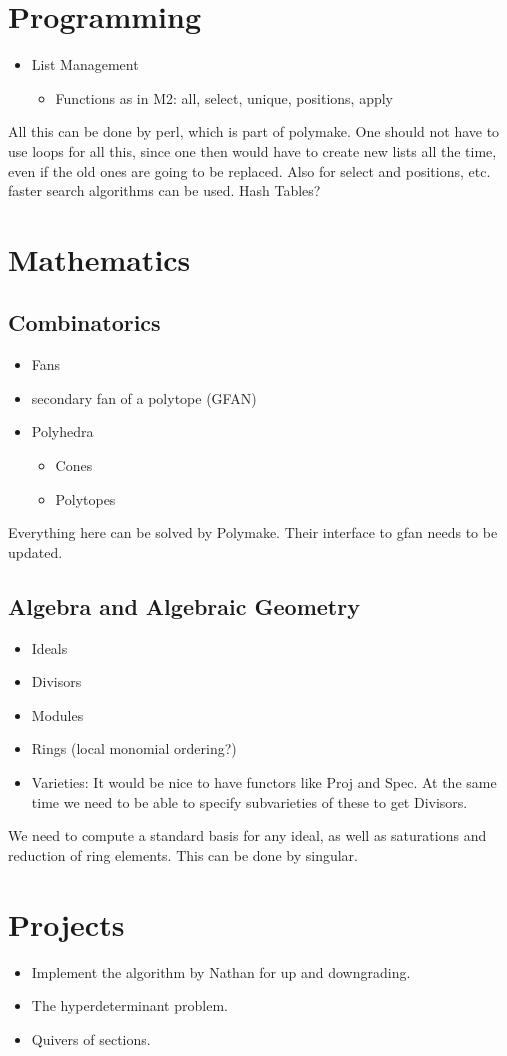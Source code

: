 \documentclass[a4paper]{article}
\begin{document}
\section{Programming}
\begin{itemize}
	\item[] List Management
	\begin{itemize}
		\item[] Functions as in M2: all, select, unique, positions, apply
	\end{itemize}
\end{itemize}
All this can be done by perl, which is part of polymake. One should not have to use loops for all this, since one then would have to create new lists all the time, even if the old ones are going to be replaced. Also for select and positions, etc. faster search algorithms can be used. Hash Tables?
\section{Mathematics}
\subsection{Combinatorics}
\begin{itemize}
	\item[] Fans
   \item[] secondary fan of a polytope (GFAN)
	\item[] Polyhedra
	\begin{itemize}
		\item[] Cones
		\item[] Polytopes
	\end{itemize}
\end{itemize}
Everything here can be solved by Polymake. Their interface to gfan needs to be updated.
\subsection{Algebra and Algebraic Geometry}
\begin{itemize}
   \item[] Ideals
	\item[] Divisors
	\item[] Modules
	\item[] Rings (local monomial ordering?)
	\item[] Varieties: It would be nice to have functors like Proj and Spec. At the same time we need to be able to specify subvarieties of these to get Divisors.
\end{itemize}
We need to compute a standard basis for any ideal, as well as saturations and reduction of ring elements.
This can be done by singular.
\section{Projects}
\begin{itemize}
\item Implement the algorithm by Nathan for up and downgrading.
\item The hyperdeterminant problem.
\item Quivers of sections.
\end{itemize}
\end{document}
